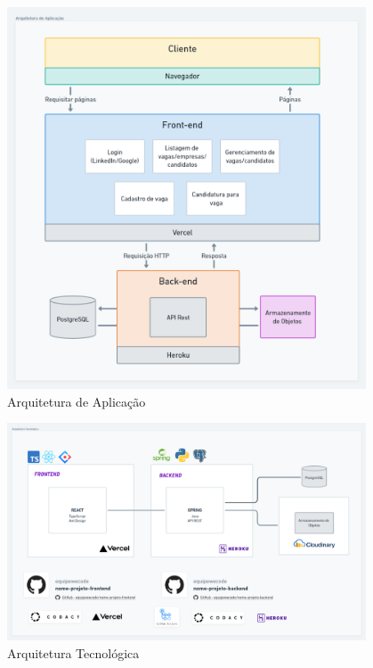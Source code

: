 \begin{figure}[H]
	\centering
	\caption{\label{fig-arq-app}Arquitetura de Aplicação}
	\includegraphics[width=0.95\textwidth]{../imagens/arq-proj-arq-app2.png}
\end{figure}

\begin{figure}[H]
	\centering
	\caption{\label{fig-arq-tec}Arquitetura Tecnológica}
	\includegraphics[width=0.95\textwidth]{../imagens/arq-proj-arq-tec2.png}
\end{figure}

